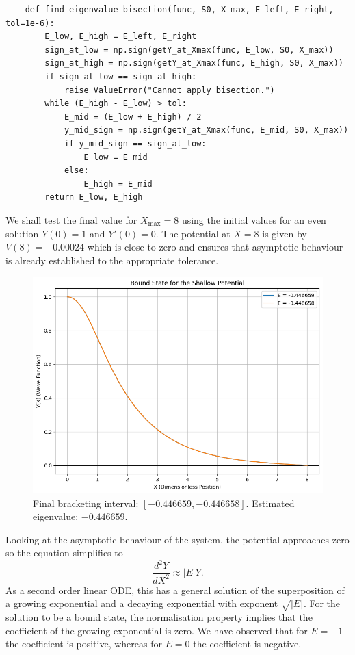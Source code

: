 \documentclass{article}
\begin{document}
\begin{verbatim}
    def find_eigenvalue_bisection(func, S0, X_max, E_left, E_right, tol=1e-6):
        E_low, E_high = E_left, E_right
        sign_at_low = np.sign(getY_at_Xmax(func, E_low, S0, X_max))
        sign_at_high = np.sign(getY_at_Xmax(func, E_high, S0, X_max))
        if sign_at_low == sign_at_high:
            raise ValueError("Cannot apply bisection.")
        while (E_high - E_low) > tol:
            E_mid = (E_low + E_high) / 2
            y_mid_sign = np.sign(getY_at_Xmax(func, E_mid, S0, X_max))
            if y_mid_sign == sign_at_low:
                E_low = E_mid
            else:
                E_high = E_mid
        return E_low, E_high
\end{verbatim}

We shall test the final value for \(X_{\max} = 8\) using the initial values for an even solution \(Y(0) = 1\) and \(Y'(0) = 0\). The potential at \(X = 8\) is given by \(V(8) = -0.00024\) which is close to zero and ensures that asymptotic behaviour is already established to the appropriate tolerance.

\begin{figure}
    \centering
    \includegraphics[width=1\linewidth]{images/bound_shallow.png}
    \caption{Final bracketing interval: \([-0.446659, -0.446658]\). Estimated eigenvalue: \(-0.446659\).}
\end{figure}

Looking at the asymptotic behaviour of the system, the potential approaches zero so the equation simplifies to
\[ \frac{d^2Y}{dX^2} \approx |E| Y. \]
As a second order linear ODE, this has a general solution of the superposition of a growing exponential and a decaying exponential with exponent \(\sqrt{|E|}\). For the solution to be a bound state, the normalisation property implies that the coefficient of the growing exponential is zero. We have observed that for \(E = -1\) the coefficient is positive, whereas for \(E = 0\) the coefficient is negative. 
\end{document}
